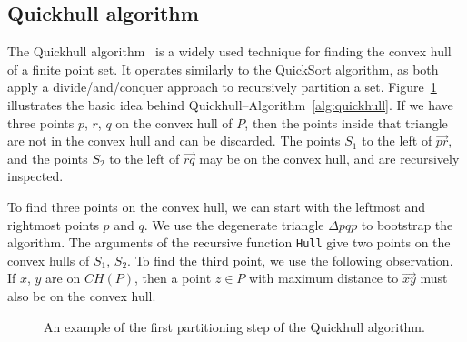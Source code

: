 \documentclass[11pt,a4paper]{article}
\begin{document}
\subsection{Quickhull algorithm}
The Quickhull algorithm~\cite{barber1996quick} is a widely used technique for finding the convex hull of a finite point set.
It operates similarly to the QuickSort algorithm, as both apply a divide\-/and\-/conquer approach to recursively partition a set.
Figure~\ref{fig:quickhull} illustrates the basic idea behind Quickhull\---Algorithm~\ref{alg:quickhull}.
If we have three points $p$, $r$, $q$ on the convex hull of $P$, then the points inside that triangle are not in the convex hull and can be discarded.
The points $S_1$ to the left of $\overrightarrow{pr}$, and the points $S_2$ to the left of $\overrightarrow{rq}$ may be on the convex hull, and are recursively inspected.

To find three points on the convex hull, we can start with the leftmost and rightmost points $p$ and $q$.
We use the degenerate triangle $\Delta pqp$ to bootstrap the algorithm.
The arguments of the recursive function \texttt{Hull} give two points on the convex hulls of $S_1$, $S_2$.
To find the third point, we use the following observation.
If $x$, $y$ are on $CH(P)$, then a point $z \in P$ with maximum distance to $\overrightarrow{xy}$ must also be on the convex hull.

\begin{figure}[ht]
  \centering
  \caption{An example of the first partitioning step of the Quickhull algorithm.}%
  \label{fig:quickhull}%
\end{figure}
\end{document}
